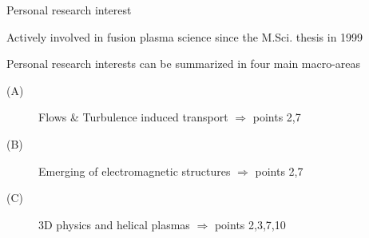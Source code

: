 \documentclass[t,10pt]{beamer}
\begin{document}
\begin{frame}{Personal research interest}
\begin{itemize}
{\large\item Actively involved in fusion plasma science since the
M.Sci. thesis in 1999
\item Personal research interests can be summarized in four main
  macro-areas
\begin{description}
\item[(A)] \textcolor{taorange}{Flows \& Turbulence induced transport
    $\Rightarrow$ points 2,7}
\item[(B)]\textcolor{ta3chameleon}{Emerging of electromagnetic
    structures $\Rightarrow$ points 2,7}
\item[(C)] \textcolor{tascarletred}{3D physics and helical plasmas
    $\Rightarrow$ points 2,3,7,10}
\end{description}
}\end{itemize}
\end{frame}
\end{document}
